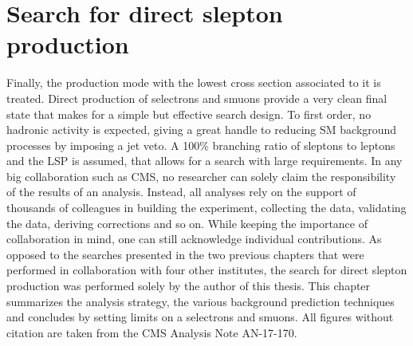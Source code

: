\chapter{Search for direct slepton\\ production}\label{sec:slepton}
\noindent\justify
Finally, the production mode with the lowest cross section associated to it is treated. 
Direct production of selectrons and smuons provide a very clean final state that makes for a simple but effective search design. 
To first order, no hadronic activity is expected, giving a great handle to reducing SM background processes by imposing a jet veto. 
A 100\% branching ratio of sleptons to leptons and the \firstchi LSP is assumed, that allows for a search with large \ptmiss requirements. 
\newpara
\noindent\justify
In any big collaboration such as CMS, no researcher can solely claim the responsibility of the results of an analysis. 
Instead, all analyses rely on the support of thousands of colleagues in building the experiment, collecting the data, validating the data, deriving corrections and so on. 
While keeping the importance of collaboration in mind, one can still acknowledge individual contributions. 
As opposed to the searches presented in the two previous chapters that were performed in collaboration with four other institutes, the search for direct slepton production was performed solely by the author of this thesis.
\newpara
\noindent\justify
This chapter summarizes the analysis strategy, the various background prediction techniques and concludes by setting limits on a selectrons and smuons. 
All figures without citation are taken from the CMS Analysis Note AN-17-170.
\newpage
